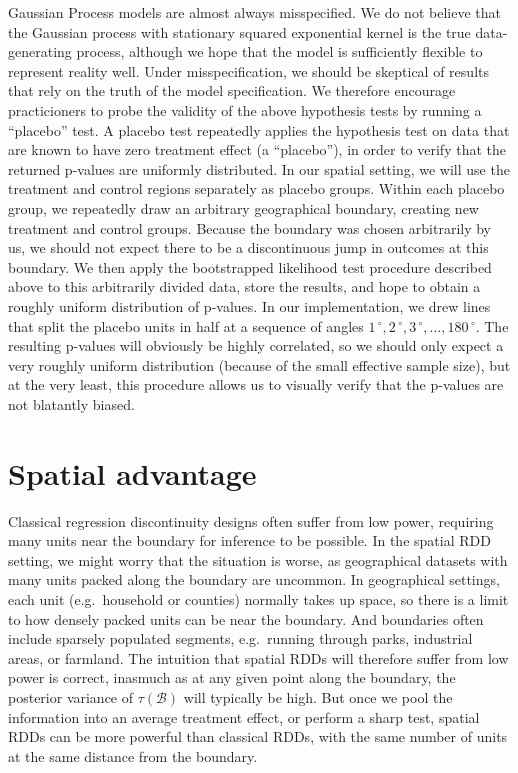 \documentclass[letter]{article}
\newcommand{\boundary}{\mathcal{B}}
\newcommand{\degree}{{\,^\circ}}
\begin{document}
\label{sec:placebo}
    	Gaussian Process models are almost always misspecified.
We do not believe that the Gaussian process with stationary squared exponential kernel is the true data-generating process, although we hope that the model is sufficiently flexible to represent reality well.
Under misspecification, we should be skeptical of results that rely on the truth of the model specification.
We therefore encourage practicioners to probe the validity of the above hypothesis tests by running a ``placebo'' test.
A placebo test repeatedly applies the hypothesis test on data that are known to have zero treatment effect (a ``placebo''),
in order to verify that the returned p-values are uniformly distributed.
In our spatial setting, we will use the treatment and control regions separately as placebo groups.
Within each placebo group, we repeatedly draw an arbitrary geographical boundary, creating new treatment and control groups.
Because the boundary was chosen arbitrarily by us, we should not expect there to be a discontinuous jump in outcomes at this boundary.
We then apply the bootstrapped likelihood test procedure described above to this arbitrarily divided data, store the results, and hope to obtain a roughly uniform distribution of p-values.
In our implementation, we drew lines that split the placebo units in half at a sequence of angles \(1\degree,2\degree,3\degree,\ldots,180\degree\).
The resulting p-values will obviously be highly correlated, so we should only expect a very roughly uniform distribution (because of the small effective sample size), but at the very least, this procedure allows us to visually verify that the p-values are not blatantly biased.
    


    	\section{Spatial advantage}\label{spatial-advantage}

Classical regression discontinuity designs often suffer from low power, requiring many units near the boundary for inference to be possible.
In the spatial RDD setting, we might worry that the situation is worse, as geographical datasets with many units packed along the boundary are uncommon.
In geographical settings, each unit (e.g.~household or counties) normally takes up space, so there is a limit to how densely packed units can be near the boundary.
And boundaries often include sparsely populated segments, e.g.~running through parks, industrial areas, or farmland.
The intuition that spatial RDDs will therefore suffer from low power is correct, inasmuch as at any given point along the boundary, the posterior variance of \(\tau(\boundary)\) will typically be high.
But once we pool the information into an average treatment effect, or perform a sharp test, spatial RDDs can be more powerful than classical RDDs, with the same number of units at the same distance from the boundary.
\end{document}
